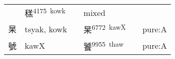 \documentclass[14pt,a4paper]{scrartcl}
\begin{document}
\begin{longtable}[c]{@{}llllll@{}}
\begin{minipage}[t]{0.14\columnwidth}
\strut\end{minipage} &
\begin{minipage}[t]{0.14\columnwidth}\raggedright\strut
䅵\textsuperscript{4175~kowk}
\strut\end{minipage} &
\begin{minipage}[t]{0.14\columnwidth}\raggedright\strut
\strut\end{minipage} &
\begin{minipage}[t]{0.14\columnwidth}\raggedright\strut
mixed
\strut\end{minipage}\tabularnewline
\begin{minipage}[t]{0.14\columnwidth}\raggedright\strut
杲
\strut\end{minipage} &
\begin{minipage}[t]{0.14\columnwidth}\raggedright\strut
tsyak, kowk
\strut\end{minipage} &
\begin{minipage}[t]{0.14\columnwidth}\raggedright\strut
\strut\end{minipage} &
\begin{minipage}[t]{0.14\columnwidth}\raggedright\strut
杲\textsuperscript{6772~kawX}
\strut\end{minipage} &
\begin{minipage}[t]{0.14\columnwidth}\raggedright\strut
\strut\end{minipage} &
\begin{minipage}[t]{0.14\columnwidth}\raggedright\strut
pure:A
\strut\end{minipage}\tabularnewline
\begin{minipage}[t]{0.14\columnwidth}\raggedright\strut
號
\strut\end{minipage} &
\begin{minipage}[t]{0.14\columnwidth}\raggedright\strut
kawX
\strut\end{minipage} &
\begin{minipage}[t]{0.14\columnwidth}\raggedright\strut
\strut\end{minipage} &
\begin{minipage}[t]{0.14\columnwidth}\raggedright\strut
饕\textsuperscript{9955~thaw}
\strut\end{minipage} &
\begin{minipage}[t]{0.14\columnwidth}\raggedright\strut
\strut\end{minipage} &
\begin{minipage}[t]{0.14\columnwidth}\raggedright\strut
pure:A
\strut\end{minipage}\tabularnewline

\end{longtable}
\end{document}
